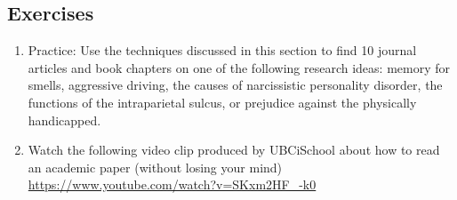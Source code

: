 \subsection{Exercises}
\begin{fullwidth}
\begin{enumerate}
\item Practice: Use the techniques discussed in this section to find 10 journal articles and book chapters on one of the following research ideas: memory for smells, aggressive driving, the causes of narcissistic personality disorder, the functions of the intraparietal sulcus, or prejudice against the physically handicapped.
\item Watch the following video clip produced by UBCiSchool about how to read an academic paper (without losing your mind) \url{https://www.youtube.com/watch?v=SKxm2HF_-k0}
\end{enumerate}
\end{fullwidth}
